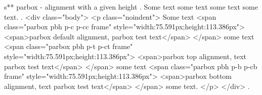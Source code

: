 s** parbox - alignment with a given height
.
\noindent
Some text
some text
some text
some text.
.
<div class="body">
<p class="noindent">
Some text <span class="parbox pbh p-c p-cc frame" style="width:75.591px;height:113.386px">
<span>parbox default alignment, parbox test text</span>
</span> some text <span class="parbox pbh p-t p-ct frame" style="width:75.591px;height:113.386px">
<span>parbox top alignment, text parbox test text</span>
</span> some text <span class="parbox pbh p-b p-cb frame" style="width:75.591px;height:113.386px">
<span>parbox bottom alignment, text parbox test text</span>
</span> some text.
</p>
</div>
.

